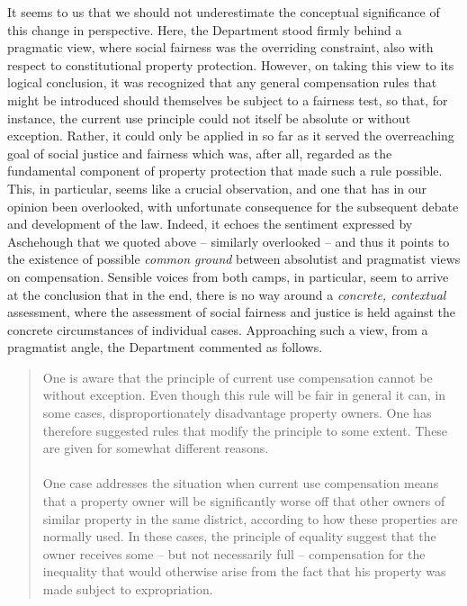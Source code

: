 \documentclass[10pt]{article} %
\begin{document}
It seems to us that we should not underestimate the conceptual significance of this change in perspective. Here, the Department stood firmly behind a pragmatic view, where social fairness was the overriding constraint, also with respect to constitutional property protection. However, on taking this view to its logical conclusion, it was recognized that any general compensation rules that might be introduced should themselves be subject to a fairness test, so that, for instance, the current use principle could not itself be absolute or without exception. Rather, it could only be applied in so far as it served the overreaching goal of social justice and fairness which was, after all, regarded as the fundamental component of property protection that made such a rule possible. This, in particular, seems like a crucial observation, and one that has in our opinion been overlooked, with unfortunate consequence for the subsequent debate and development of the law. Indeed, it echoes the sentiment expressed by Aschehough that we quoted above -- similarly overlooked -- and thus it points to the existence of possible \emph{common ground} between absolutist and pragmatist views on compensation. Sensible voices from both camps, in particular, seem to arrive at the conclusion that in the end, there is no way around a \emph{concrete, contextual} assessment, where the assessment of social fairness and justice is held against the concrete circumstances of individual cases. Approaching such a view, from a pragmatist angle, the Department commented as follows.  

\begin{quote}
One is aware that the principle of current use compensation cannot be without exception. Even though this rule will be fair in general it can, in some cases, disproportionately disadvantage property owners. One has therefore suggested rules that modify the principle to some extent. These are given for somewhat different  reasons. \\ \\

One case addresses the situation when current use compensation means that a property owner will be significantly worse off that other owners of similar property in the same district, according to how these properties are normally used. In these cases, the principle of equality suggest that the owner receives some -- but not necessarily full -- compensation for the inequality that would otherwise arise from the fact that his property was made subject to expropriation. %
\end{quote}
\end{document}
